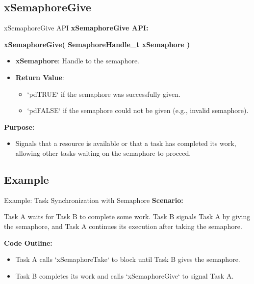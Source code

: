 \documentclass[10pt]{beamer}
\begin{document}
\subsection{xSemaphoreGive}
\begin{frame}{xSemaphoreGive API}
    \textbf{xSemaphoreGive API:}
    
    \vspace{0.2cm}
    \textbf{xSemaphoreGive( SemaphoreHandle\_t xSemaphore )}
    
    \begin{itemize}
        \item \textbf{xSemaphore}: Handle to the semaphore.
        \item \textbf{Return Value}: 
            \begin{itemize}
                \item `pdTRUE` if the semaphore was successfully given.
                \item `pdFALSE` if the semaphore could not be given (e.g., invalid semaphore).
            \end{itemize}
    \end{itemize}
    
    \vspace{0.3cm}
    
    \textbf{Purpose:}
    \begin{itemize}
        \item Signals that a resource is available or that a task has completed its work, allowing other tasks waiting on the semaphore to proceed.
    \end{itemize}
    
\end{frame}

\subsection{Example}
\begin{frame}{Example: Task Synchronization with Semaphore}
    \textbf{Scenario:}
    
    \vspace{0.2cm}
    Task A waits for Task B to complete some work. Task B signals Task A by giving the semaphore, and Task A continues its execution after taking the semaphore.
    
    \vspace{0.2cm}
    \textbf{Code Outline:}
    \begin{itemize}
        \item Task A calls `xSemaphoreTake` to block until Task B gives the semaphore.
        \item Task B completes its work and calls `xSemaphoreGive` to signal Task A.
    \end{itemize}
    
\end{frame}
\end{document}
